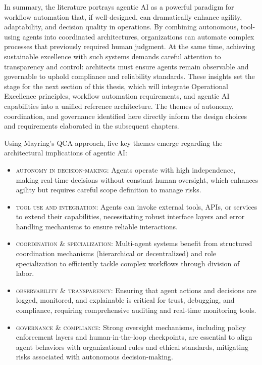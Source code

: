 In summary, the literature portrays agentic AI as a powerful paradigm for workflow automation that, if well-designed, can dramatically enhance agility, adaptability, and decision quality in operations. By combining autonomous, tool-using agents into coordinated architectures, organizations can automate complex processes that previously required human judgment. At the same time, achieving sustainable excellence with such systems demands careful attention to transparency and control: architects must ensure agents remain observable and governable to uphold compliance and reliability standards. These insights set the stage for the next section of this thesis, which will integrate Operational Excellence principles, workflow automation requirements, and agentic AI capabilities into a unified reference architecture. The themes of autonomy, coordination, and governance identified here directly inform the design choices and requirements elaborated in the subsequent chapters.

Using Mayring's QCA approach, five key themes emerge regarding the architectural implications of agentic AI:
\begin{itemize}
    \item \textsc{autonomy in decision-making:} Agents operate with high independence, making real-time decisions without constant human oversight, which enhances agility but requires careful scope definition to manage risks.
    \item \textsc{tool use and integration:} Agents can invoke external tools, APIs, or services to extend their capabilities, necessitating robust interface layers and error handling mechanisms to ensure reliable interactions.
    \item \textsc{coordination \& specialization:} Multi-agent systems benefit from structured coordination mechanisms (hierarchical or decentralized) and role specialization to efficiently tackle complex workflows through division of labor.
    \item \textsc{observability \& transparency:} Ensuring that agent actions and decisions are logged, monitored, and explainable is critical for trust, debugging, and compliance, requiring comprehensive auditing and real-time monitoring tools.
    \item \textsc{governance \& compliance:} Strong oversight mechanisms, including policy enforcement layers and human-in-the-loop checkpoints, are essential to align agent behaviors with organizational rules and ethical standards, mitigating risks associated with autonomous decision-making.
\end{itemize}

